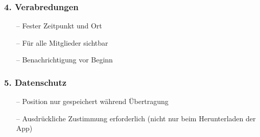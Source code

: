 \documentclass[aspectratio=1610]{beamer}
\begin{document}
\begin{frame}[plain]
\frametitle{4. Verabredungen}
\begin{minipage}{0.5\textwidth}
	\setlength{\fboxsep}{0pt}%
	\setlength{\fboxrule}{1pt}%
	\captionsetup{labelformat=empty}
	\centering
\end{minipage}%
\begin{minipage}{0.5\textwidth}
	\begin{itemize}
		\setlength\itemsep{0.3em}
		\item[--] Fester Zeitpunkt und Ort
		\item[--] Für alle Mitglieder sichtbar
		\item[--] Benachrichtigung vor Beginn
	\end{itemize}
\end{minipage}
\end{frame}


\begin{frame}[plain]
\frametitle{5. Datenschutz}

	\begin{itemize}
		\setlength\itemsep{0.3em}
		\item[--] Position nur gespeichert während Übertragung
		\item[--] Ausdrückliche Zustimmung erforderlich (nicht nur beim Herunterladen der App)
	\end{itemize}
\end{frame}
\end{document}
